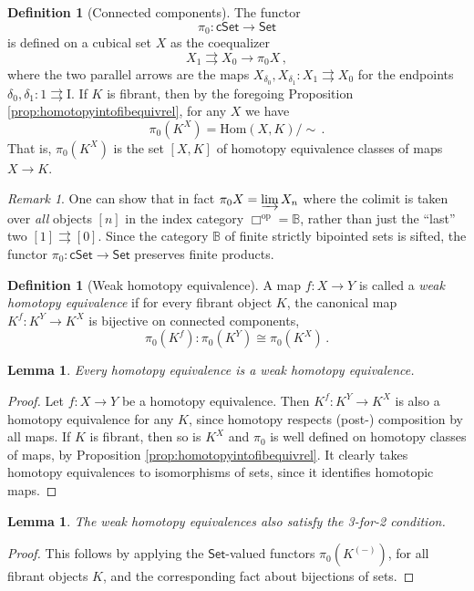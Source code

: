 \documentclass[11pt,reqno]{amsart}
\newcommand{\B}{\ensuremath{\mathbb{B}}}
\newcommand{\Set}{\ensuremath{\mathsf{Set}}}
\newcommand{\cSet}{\ensuremath{\mathsf{cSet}}}
\newcommand{\op}[1]{\ensuremath{{#1}^{\mathrm{op}}}}
\newcommand{\ra}{\ensuremath{\rightarrow}}
\renewcommand{\hom}{\ensuremath{\mathrm{Hom}}}
\newcommand{\I}{\ensuremath{\mathrm{I}}}
\newtheorem{lemma}[theorem]{Lemma}
\theoremstyle{remark}
\newtheorem{remark}[theorem]{Remark}
\theoremstyle{definition}
\newtheorem{definition}[theorem]{Definition}
\begin{document}
\begin{definition}[Connected components]
The functor 
\[
\pi_0 : \cSet\ra\Set
\]
 is defined on a cubical set $X$ as the coequalizer 
 \[
 X_1\rightrightarrows X_0\ra \pi_0X\,,
 \]
  where the two parallel arrows are the maps $X_{\delta_0}, X_{\delta_1} : X_1 \rightrightarrows X_0$ for the endpoints $\delta_0, \delta_1 : 1 \rightrightarrows \I$.   If $K$ is fibrant, then by the foregoing Proposition \ref{prop:homotopyintofibequivrel}, for any $X$ we have  
  \[
  \pi_0(K^X) = \hom(X,K)/\!\!\sim\,.
  \]
    That is, $\pi_0(K^X)$ is the set  $[X, K]$ of homotopy equivalence classes of maps $X\ra K$.
\end{definition}

\begin{remark}
One can show that in fact $\pi_0X = \varinjlim X_n$ where the colimit is taken over \emph{all} objects $[n]$ in the index category $\op\Box = \B$, rather than just the ``last'' two $[1]\rightrightarrows [0]$. Since the category $\B$ of finite strictly bipointed sets is sifted, 
the functor $\pi_0: \cSet\ra\Set$ preserves finite products. 
\end{remark}

\begin{definition}[Weak homotopy equivalence]\label{def:WHE}
A map $f: X\ra Y$ is called a \emph{weak homotopy equivalence} if for every fibrant object $K$, the canonical map $K^f : K^Y \ra K^X$ is bijective on connected components,  
\[
\pi_0(K^f) : \pi_0(K^Y) \cong \pi_0(K^X)\,.
\]
\end{definition}

\begin{lemma}\label{lemma:HEisWHE}
Every homotopy equivalence is a weak homotopy equivalence.
\end{lemma}
%
\begin{proof}
Let $f: X\ra Y$ be a homotopy equivalence.  Then $K^f : K^Y \ra K^X$ is also a homotopy equivalence for any $K$, since homotopy respects (post-) composition by all maps.  If $K$ is fibrant, then so is $K^X$ and $\pi_0$ is well defined on homotopy classes of maps, by Proposition \ref{prop:homotopyintofibequivrel}.  It clearly takes homotopy equivalences to isomorphisms of sets, since it identifies homotopic maps.
\end{proof}

\begin{lemma}\label{lemma:WHE342}
The weak homotopy equivalences also satisfy the 3-for-2 condition. 
\end{lemma}
\begin{proof}
This follows by applying the $\Set$-valued functors $\pi_0(K^{(-)})$, for all fibrant objects $K$, and the corresponding fact about bijections of sets.
\end{proof}
\end{document}
